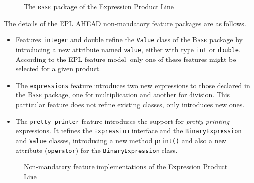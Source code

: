 \begin{figure}[htb]
    \label{fig:epl-base}
    \caption{The \textsc{base} package of the Expression Product Line}
\end{figure} 

The details of the EPL AHEAD non-mandatory feature packages are as follows. 

\begin{itemize}
    \item Features \texttt{integer} and {double} refine the \texttt{Value} class of 
    the \textsc{Base} package by introducing a new attribute named 
    \texttt{value}, either with type \texttt{int} or \texttt{double}. According 
    to the EPL feature model, only one of these features might be selected for 
    a given product. 

    \item The \texttt{expressions} feature introduces two new expressions 
    to those declared in the \textsc{Base} package, one for multiplication 
    and another for division. This particular feature does not refine 
    existing classes, only introduces new ones. 

    \item The \texttt{pretty\_printer} feature introduces the support for 
    \emph{pretty printing} expressions. It refines the \texttt{Expression} 
    interface and the \texttt{BinaryExpression} and \texttt{Value} classes, 
    introducing a new method \texttt{print()} and also a 
    new attribute (\texttt{operator}) for the \texttt{BinaryExpression} class.
\end{itemize}


\begin{figure}[htb]
\label{fig:epl-features}
\caption{Non-mandatory feature implementations of the Expression Product Line}
\end{figure} 


